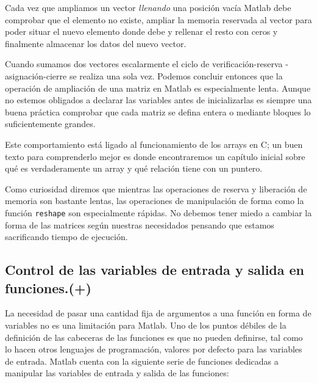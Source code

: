 Cada vez que ampliamos un vector \emph{llenando} una posición vacía
Matlab debe comprobar que el elemento no existe, ampliar la memoria
reservada al vector para poder situar el nuevo elemento donde debe y
rellenar el resto con ceros y finalmente almacenar los datos del nuevo
vector.

Cuando sumamos dos vectores escalarmente el ciclo de
verificación-reserva -asignación-cierre se realiza una sola vez.
Podemos concluir entonces que la operación de ampliación de una matriz
en Matlab es especialmente lenta.  Aunque no estemos obligados a
declarar las variables antes de inicializarlas es siempre una buena
práctica comprobar que cada matriz se defina entera o mediante bloques
lo suficientemente grandes.

Este comportamiento está ligado al funcionamiento de los arrays en C;
un buen texto para comprenderlo mejor es \cite{Numerical} donde
encontraremos un capítulo inicial sobre qué es verdaderamente un array
y qué relación tiene con un puntero.

Como curiosidad diremos que mientras las operaciones de reserva y
liberación de memoria son bastante lentas, las operaciones de
manipulación de forma como la función \texttt{reshape} son
especialmente rápidas.  No debemos tener miedo a cambiar la forma de
las matrices según nuestras necesidados pensando que estamos
sacrificando tiempo de ejecución.

\subsection{Control de las variables de entrada y salida en
  funciones.(+)}

La necesidad de pasar una cantidad fija de argumentos a una función en
forma de variables no es una limitación para Matlab. Uno de los puntos
débiles de la definición de las cabeceras de las funciones es que no
pueden definirse, tal como lo hacen otros lenguajes de programación,
valores por defecto para las variables de entrada. Matlab cuenta con
la siguiente serie de funciones dedicadas a manipular las variables de
entrada y salida de las funciones:

